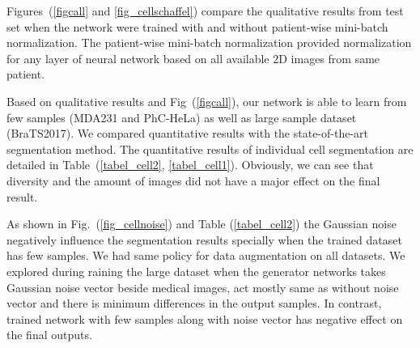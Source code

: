 \documentclass[10pt,twocolumn,letterpaper]{article}
\begin{document}
Figures~(\ref{figcall} and \ref{fig_cellschaffel}) compare the qualitative results from test set when the network were trained with and without patient-wise mini-batch normalization. The patient-wise mini-batch normalization provided normalization for any layer of neural network based on all available 2D images from same patient.%

Based on qualitative results and Fig~(\ref{figcall}), our network is able to learn from few samples (MDA231 and PhC-HeLa) as well as large sample dataset (BraTS2017). We compared quantitative results with the state-of-the-art segmentation method. The quantitative results of individual cell segmentation are detailed in Table~(\ref{tabel_cell2}, \ref{tabel_cell1}). Obviously, we can see that diversity and the amount of images did not have a major effect on the final result.

As shown in Fig.~(\ref{fig_cellnoise}) and Table (\ref{tabel_cell2}) the Gaussian noise negatively influence the segmentation results specially when the trained dataset has few samples.
We had same policy for data augmentation on all datasets. 
We explored during raining the large dataset when the generator networks takes Gaussian noise vector beside medical images, act mostly same as without noise vector and there is minimum differences in the output samples. In contrast, trained network with few samples along with noise vector has negative effect on the final outputs. 
\end{document}
